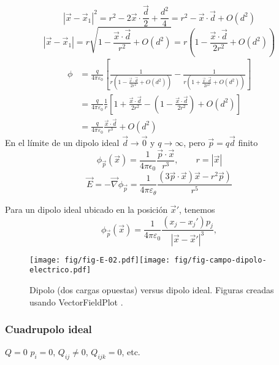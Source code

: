 \begin{equation}
\left|\vec{x}-\vec{x}_1\right|^2=r^2-2 \vec{x} \cdot \frac{\vec{d}}{2}+\frac{d^2}{4} = r^2-\vec{x} \cdot \vec{d}+ O\left(d^2\right)
\end{equation}
\begin{equation}
\left|\vec{x}-\vec{x}_1\right|  = r \sqrt{1-\frac{\vec{x}\cdot\vec{d}}{r^2}+O\left(d^2\right)} = r\left(1-\frac{\vec{x}\cdot\vec{d}}{2r^2}+O\left(d^2\right)\right)
\end{equation}
\begin{align}
\phi &=\frac{q}{4 \pi \varepsilon_0}\left[\frac{1}{r\left(1-\frac{\vec{x}\cdot\vec{d}}{2r^2}+ O\left(d^2\right)\right)}- \frac{1}{r\left(1+\frac{\vec{x}\cdot\vec{d}}{2r^2}+ O\left(d^2\right)\right)}\right] \\
&= \frac{q}{4 \pi \varepsilon_0} \frac{1}{r}\left[1+\frac{\vec{x}\cdot\vec{d}}{2r^2}-\left(1-\frac{\vec{x}\cdot\vec{d}}{2r^2}\right)+ O\left(d^2\right)\right] \\
 & =\frac{q}{4 \pi \varepsilon_0} \frac{\vec{x} \cdot \vec{d}}{r^3}+O\left(d^2\right)
\end{align}
En el límite de un dipolo ideal
$\vec{d} \rightarrow \vec{0}$ y $q\rightarrow \infty$, pero $\vec{p}=q \vec{d}$ finito
\begin{equation}
\phi_{\vec{p}}(\vec{x})=\frac{1}{4\pi\epsilon_0}\frac{\vec{p}\cdot\vec{x}}{r^3}, \qquad r=|\vec{x}|
\end{equation}
\begin{equation}
\vec{E}=-\vec{\nabla} \phi_{\vec{p}}=\frac{1}{4 \pi \varepsilon_\theta} \frac{\left.(3 \vec{p} \cdot \vec{x}) \vec{x}-r^2 \vec{p}\right)}{r^5}
\end{equation}

Para un dipolo ideal ubicado en la posición $\vec{x}'$, tenemos
\begin{equation}\label{phip}
\phi_{\vec{p}}(\vec{x})=\frac{1}{4\pi\varepsilon_0}\frac{(x_j-x_j')p_j}
{|\vec{x}-\vec{x}'|^3},
\end{equation}
\begin{figure}[H]
\begin{center}
\texttt{[image: fig/fig-E-02.pdf]}\hspace{1cm}\texttt{[image: fig/fig-campo-dipolo-electrico.pdf]} 
\caption{Dipolo (dos cargas opuestas) versus dipolo ideal. Figuras creadas usando VectorFieldPlot \cite{VFP}.}
\label{fig-dipolos}
\end{center}
\end{figure}
\subsubsection{Cuadrupolo ideal}
$Q=0$ $p_i=0$, $Q_{ij}\neq 0$, $Q_{ijk}=0$, etc.

